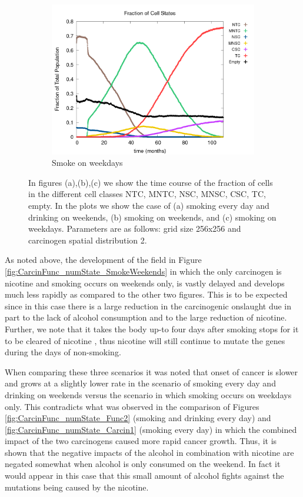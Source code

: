 \documentclass[\main/thesis.tex]{subfiles}
\begin{document}
\begin{figure}[H]
    \begin{subfigure}[t]{.6\textwidth}
      \centering
      \includegraphics[width=\textwidth]{images/4_CarcinFunc/Fig8/numState_all_SmokeWeekdays.png}
      \caption{Smoke on weekdays}
      \label{fig:CarcinFunc_numState_SmokeWeekdays}
    \end{subfigure}
    \caption{In figures (a),(b),(c) we show the time course of the fraction of cells in the different cell classes NTC, MNTC, NSC, MNSC, CSC, TC, empty. In the plots we show the case of (a) smoking every day and drinking on weekends, (b) smoking on weekends, and (c) smoking on weekdays. Parameters are as follows: grid size 256x256 and carcinogen spatial distribution 2.}
    \label{fig:CarcinFunc_numState_CyclicCarcin}
\end{figure}

As noted above, the development of the field in Figure \ref{fig:CarcinFunc_numState_SmokeWeekends} in which the only carcinogen is nicotine and smoking occurs on weekends only, is vastly delayed and develops much less rapidly as compared to the other two figures. This is to be expected since in this case there is a large reduction in the carcinogenic onslaught due in part to the lack of alcohol consumption and to the large reduction of nicotine. Further, we note that it takes the body up-to four days after smoking stops for it to be cleared of nicotine \cite{Benowitz}, thus nicotine will still continue to mutate the genes during the days of non-smoking.

When comparing these three scenarios it was noted that onset of cancer is slower and grows at a slightly lower rate in the scenario of smoking every day and drinking on weekends versus the scenario in which smoking occurs on weekdays only. This contradicts what was observed in the comparison of Figures \ref{fig:CarcinFunc_numState_Func2} (smoking and drinking every day) and \ref{fig:CarcinFunc_numState_Carcin1} (smoking every day) in which the combined impact of the two carcinogens caused more rapid cancer growth. Thus, it is shown that the negative impacts of the alcohol in combination with nicotine are negated somewhat when alcohol is only consumed on the weekend. In fact it would appear in this case that this small amount of alcohol fights against the mutations being caused by the nicotine.
\end{document}
